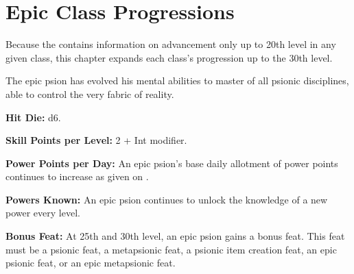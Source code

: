 \section{Epic Class Progressions}
Because the  contains information on advancement only up to 20th level in any given class, this chapter expands each class's progression up to the 30th level.








The epic psion has evolved his mental abilities to master of all psionic disciplines, able to control the very fabric of reality.

\textbf{Hit Die:} d6.

\textbf{Skill Points per Level:} 2 + Int modifier.

\textbf{Power Points per Day:} An epic psion's base daily allotment of power points continues to increase as given on .

\textbf{Powers Known:} An epic psion continues to unlock the knowledge of a new power every level.

\textbf{Bonus Feat:} At 25th and 30th level, an epic psion gains a bonus feat. This feat must be a psionic feat, a metapsionic feat, a psionic item creation feat, an epic psionic feat, or an epic metapsionic feat.





